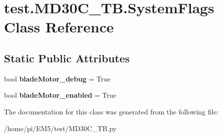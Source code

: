 \hypertarget{classtest_1_1MD30C__TB_1_1SystemFlags}{}\section{test.\+M\+D30\+C\+\_\+\+T\+B.\+System\+Flags Class Reference}
\label{classtest_1_1MD30C__TB_1_1SystemFlags}
\subsection*{Static Public Attributes}
\begin{DoxyCompactItemize}
\item 
\mbox{\label{classtest_1_1MD30C__TB_1_1SystemFlags_aef9b3155dcf3ee175e0ddc6acbe7a66b}} 
bool {\bfseries blade\+Motor\+\_\+debug} = True
\item 
\mbox{\label{classtest_1_1MD30C__TB_1_1SystemFlags_aca47734e14f1c11645a46044e6b7e7b2}} 
bool {\bfseries blade\+Motor\+\_\+enabled} = True
\end{DoxyCompactItemize}


The documentation for this class was generated from the following file\+:\begin{DoxyCompactItemize}
\item 
/home/pi/\+E\+M5/test/M\+D30\+C\+\_\+\+T\+B.\+py\end{DoxyCompactItemize}

